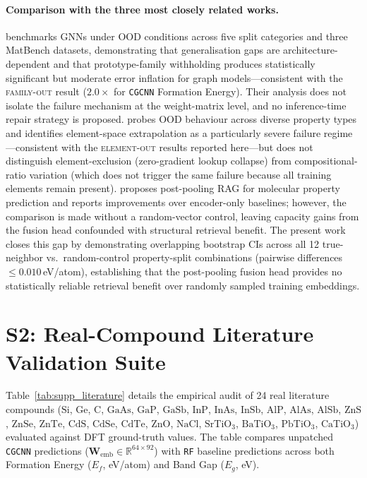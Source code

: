 \documentclass[preprint,12pt]{elsarticle}
\newcommand{\mae}{\text{MAE}}
\newcommand{\famout}{\textsc{family-out}}
\newcommand{\elout}{\textsc{element-out}}
\newcommand{\cgcnn}{\texttt{CGCNN}}
\newcommand{\rf}{\texttt{RF}}
\begin{document}
\paragraph{Comparison with the three most closely related works.}
\cite{omee2024} benchmarks GNNs under OOD conditions across five split
categories and three MatBench datasets, demonstrating that generalisation
gaps are architecture-dependent and that prototype-family withholding
produces statistically significant but moderate error inflation for
graph models---consistent with the \famout{} result ($2.0\times$ for
\cgcnn{} Formation Energy). Their analysis does not isolate the failure
mechanism at the weight-matrix level, and no inference-time repair
strategy is proposed. \cite{li2024} probes OOD behaviour across diverse
property types and identifies element-space extrapolation as a
particularly severe failure regime---consistent with the \elout{} results
reported here---but does not distinguish element-exclusion (zero-gradient
lookup collapse) from compositional-ratio variation (which does not trigger
the same failure because all training elements remain present). \cite{wang2024rag4mol}
proposes post-pooling RAG for molecular property prediction and reports
improvements over encoder-only baselines; however, the comparison is made
without a random-vector control, leaving capacity gains from the fusion head
confounded with structural retrieval benefit. The present work closes this
gap by demonstrating overlapping bootstrap CIs across all 12 true-neighbor
vs.\ random-control property-split combinations (pairwise \mae{}
differences $\le 0.010$\,eV/atom), establishing that the post-pooling
fusion head provides no statistically reliable retrieval benefit over
randomly sampled training embeddings.

\section*{S2: Real-Compound Literature Validation Suite}
\label{supp:s2}

Table~\ref{tab:supp_literature} details the empirical audit of 24 real literature compounds ($\text{Si}$, $\text{Ge}$, $\text{C}$, $\text{GaAs}$, $\text{GaP}$, $\text{GaSb}$, $\text{InP}$, $\text{InAs}$, $\text{InSb}$, $\text{AlP}$, $\text{AlAs}$, $\text{AlSb}$, $\text{ZnS}$, $\text{ZnSe}$, $\text{ZnTe}$, $\text{CdS}$, $\text{CdSe}$, $\text{CdTe}$, $\text{ZnO}$, $\text{NaCl}$, $\text{SrTiO}_3$, $\text{BaTiO}_3$, $\text{PbTiO}_3$, $\text{CaTiO}_3$) evaluated against DFT ground-truth values. The table compares unpatched \cgcnn{} predictions ($\mathbf{W}_{\text{emb}} \in \mathbb{R}^{64 \times 92}$) with \rf{} baseline predictions across both Formation Energy ($E_f$, eV/atom) and Band Gap ($E_g$, eV).
\end{document}
